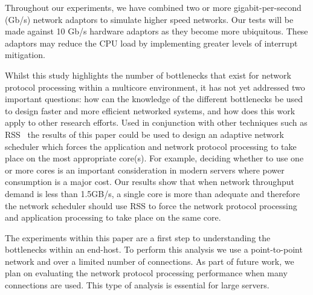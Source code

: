 \documentclass[conference, compsoc]{IEEEtran}
\begin{document}
Throughout our experiments, we have combined two or more gigabit-per-second (Gb/s) network adaptors to simulate higher speed networks. Our tests will be made against 10 Gb/s hardware adaptors as they become more ubiquitous. These adaptors may reduce the CPU load by implementing greater levels of interrupt mitigation.

Whilst this study highlights the number of bottlenecks that exist for network protocol processing within a multicore environment, it has not yet addressed two important questions: how can the knowledge of the different bottlenecks be used to design faster and more efficient networked systems, and how does this work apply to other research efforts. Used in conjunction with other techniques such as RSS~\cite{RSS} the results of this paper could be used to design an adaptive network scheduler which forces the application and network protocol processing to take place on the most appropriate core(s). For example, deciding whether to use one or more cores is an important consideration in modern servers where power consumption is a major cost. Our results show that when network throughput demand is less than 1.5GB/s, a single core is more than adequate and therefore the network scheduler should use RSS to force the network protocol processing and application processing to take place on the same core.

The experiments within this paper are a first step to understanding the bottlenecks within an end-host. To perform this analysis we use a point-to-point network and over a limited number of connections. As part of future work, we plan on evaluating the network protocol processing performance when many connections are used. This type of analysis is essential for large servers.


\end{document}

